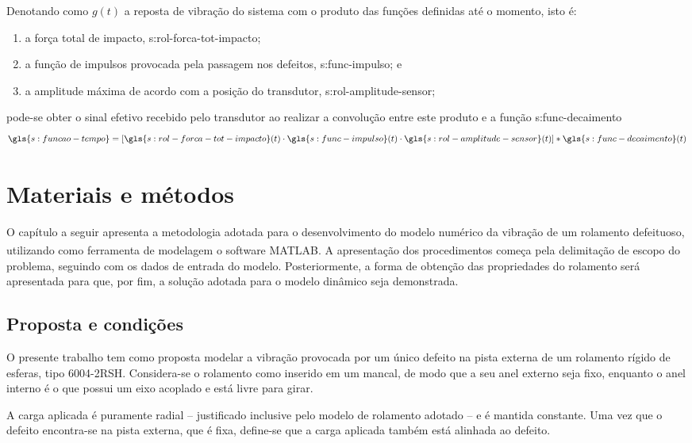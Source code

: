 \documentclass[12pt,oneside,english,brazil,lmodern,siglas,simbolos,cite=num]{ucsmonograph}
\begin{document}
	Denotando como $ g(t) $ a reposta de vibração do sistema com o produto das funções definidas até o momento, isto é:
	\begin{enumerate}
		\item a força total de impacto, \gls{s:rol-forca-tot-impacto};
		\item a função de impulsos provocada pela passagem nos defeitos, \gls{s:func-impulso}; e
		\item a amplitude máxima de acordo com a posição do transdutor, \gls{s:rol-amplitude-sensor};
	\end{enumerate}
	pode-se obter o sinal efetivo recebido pelo transdutor ao realizar a convolução entre este produto e a função \gls{s:func-decaimento} \cite{mcfadden:1984,cong:2013}
	\begin{equation}
		\gls{s:funcao-tempo} = [\gls{s:rol-forca-tot-impacto}(t)\cdot \gls{s:func-impulso}(t)\cdot \gls{s:rol-amplitude-sensor}(t)]\ast\gls{s:func-decaimento}(t)
	\end{equation}
	
	\chapter{Materiais e métodos}
	O capítulo a seguir apresenta a metodologia adotada para o desenvolvimento do modelo numérico da vibração de um rolamento defeituoso, utilizando como ferramenta de modelagem o \foreignlanguage{english}{software} MATLAB\textsuperscript\textregistered.
	A apresentação dos procedimentos começa pela delimitação de escopo do problema, seguindo com os dados de entrada do modelo.
	Posteriormente, a forma de obtenção das propriedades do rolamento será apresentada para que, por fim, a solução adotada para o modelo dinâmico seja demonstrada.
	
	\section{Proposta e condições} \label{sec:proposta-condicoes}
	O presente trabalho tem como proposta modelar a vibração provocada por um único defeito na pista externa de um rolamento rígido de esferas, tipo 6004-2RSH.
	Considera-se o rolamento como inserido em um mancal, de modo que a seu anel externo seja fixo, enquanto o anel interno é o que possui um eixo acoplado e está livre para girar.
	
	A carga aplicada é puramente radial -- justificado inclusive pelo modelo de rolamento adotado -- e é mantida constante.
	Uma vez que o defeito encontra-se na pista externa, que é fixa, define-se que a carga aplicada também está alinhada ao defeito.
	
\end{document}
